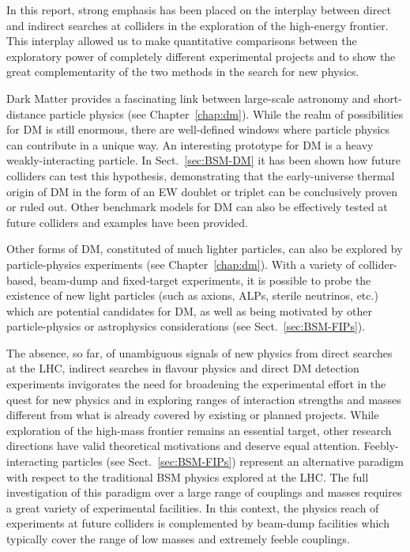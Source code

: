 \documentclass[../report.tex]{subfiles}
\begin{document}
In this report, strong emphasis has been placed on the interplay between direct and indirect searches at colliders in the exploration of the high-energy frontier. This interplay allowed us to make quantitative comparisons between the exploratory power of completely different experimental projects and to show the great complementarity of the two methods in the search for new physics. 

\medskip
{}

\noindent Dark Matter provides a fascinating link between large-scale astronomy and short-distance particle physics (see Chapter~\ref{chap:dm}). While the realm of possibilities for DM is still enormous, there are well-defined windows where particle physics can contribute in a unique way. An interesting prototype for DM is a heavy weakly-interacting particle. In Sect.~\ref{sec:BSM-DM} it has been shown how future colliders can test this hypothesis, demonstrating that the early-universe thermal origin of DM in the form of an EW doublet or triplet can be conclusively proven or ruled out. Other benchmark models for DM can also be effectively tested at future colliders and examples have been provided.

Other forms of DM, constituted of much lighter particles, can also be explored by particle-physics experiments (see Chapter~\ref{chap:dm}). With a variety of collider-based, beam-dump and fixed-target experiments, it is possible to probe the existence of new light particles (such as axions, ALPs, sterile neutrinos, etc.) which are potential candidates for DM, as well as being motivated by other particle-physics or astrophysics considerations (see Sect.~\ref{sec:BSM-FIPs}).

\medskip
{}

\noindent The absence, so far, of unambiguous signals of new physics from direct searches at the LHC, indirect searches in flavour physics and direct DM detection experiments invigorates the need for broadening the experimental effort in the quest for new physics and in exploring ranges of interaction strengths and masses different from what is already covered by existing or planned projects. While exploration of the high-mass frontier remains an essential target, other research directions have valid theoretical motivations and deserve equal attention. Feebly-interacting particles (see Sect.~\ref{sec:BSM-FIPs}) represent an alternative paradigm with respect to the traditional BSM physics explored at the LHC. The full investigation of this paradigm over a large range of couplings and masses requires a great variety of experimental facilities. In this context, the physics reach of experiments at future colliders is complemented by beam-dump facilities which typically cover the range of low masses and extremely feeble couplings.
\end{document}
